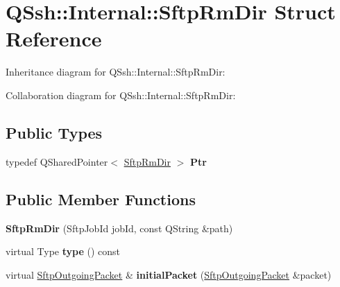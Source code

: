 \hypertarget{struct_q_ssh_1_1_internal_1_1_sftp_rm_dir}{}\section{Q\+Ssh\+:\+:Internal\+:\+:Sftp\+Rm\+Dir Struct Reference}
\label{struct_q_ssh_1_1_internal_1_1_sftp_rm_dir}


Inheritance diagram for Q\+Ssh\+:\+:Internal\+:\+:Sftp\+Rm\+Dir\+:


Collaboration diagram for Q\+Ssh\+:\+:Internal\+:\+:Sftp\+Rm\+Dir\+:
\subsection*{Public Types}
\begin{DoxyCompactItemize}
\item 
\mbox{\label{struct_q_ssh_1_1_internal_1_1_sftp_rm_dir_a8aa7e9c6ece8ed3f208cc04939fd36b3}} 
typedef Q\+Shared\+Pointer$<$ \mbox{\hyperlink{struct_q_ssh_1_1_internal_1_1_sftp_rm_dir}{Sftp\+Rm\+Dir}} $>$ {\bfseries Ptr}
\end{DoxyCompactItemize}
\subsection*{Public Member Functions}
\begin{DoxyCompactItemize}
\item 
\mbox{\label{struct_q_ssh_1_1_internal_1_1_sftp_rm_dir_aba40202a03f8270498e666103c0bf2aa}} 
{\bfseries Sftp\+Rm\+Dir} (Sftp\+Job\+Id job\+Id, const Q\+String \&path)
\item 
\mbox{\label{struct_q_ssh_1_1_internal_1_1_sftp_rm_dir_a5e26c389e1875a8c29dc0de1879fa961}} 
virtual Type {\bfseries type} () const
\item 
\mbox{\label{struct_q_ssh_1_1_internal_1_1_sftp_rm_dir_a85824a51d25740efc6b2be300e13ec36}} 
virtual \mbox{\hyperlink{class_q_ssh_1_1_internal_1_1_sftp_outgoing_packet}{Sftp\+Outgoing\+Packet}} \& {\bfseries initial\+Packet} (\mbox{\hyperlink{class_q_ssh_1_1_internal_1_1_sftp_outgoing_packet}{Sftp\+Outgoing\+Packet}} \&packet)
\end{DoxyCompactItemize}
